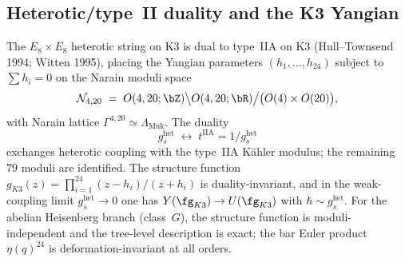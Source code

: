 \smallskip\noindent



\subsection{Heterotic/type~II duality and the K3 Yangian}
\label{subsec:k3-heterotic-typeII}

The $E_8\times E_8$ heterotic string on K3 is dual to type~IIA on K3
(Hull--Townsend 1994; Witten 1995), placing the Yangian parameters
$(h_1,\ldots,h_{24})$ subject to $\sum h_i=0$ on the Narain moduli space
\begin{equation}\label{eq:narain-moduli}
 \mathcal{N}_{4,20}
 \;=\;
 O(4,20;\bZ)\big\backslash O(4,20;\bR)\big/\bigl(O(4)\times O(20)\bigr),
\end{equation}
with Narain lattice $\Gamma^{4,20}\simeq\Lambda_{\mathrm{Muk}}$. The
duality
\begin{equation}\label{eq:het-iia-coupling}
 g_s^{\mathrm{het}} \;\longleftrightarrow\; t^{\mathrm{IIA}} = 1/g_s^{\mathrm{het}}
\end{equation}
exchanges heterotic coupling with the type~IIA K\"ahler modulus; the
remaining $79$ moduli are identified. The structure function
$g_{K3}(z) = \prod_{i=1}^{24}(z-h_i)/(z+h_i)$ is duality-invariant, and
in the weak-coupling limit $g_s^{\mathrm{het}}\to 0$ one has
$Y(\fg_{K3})\to U(\fg_{K3})$ with $\hbar\sim g_s^{\mathrm{het}}$. For the
abelian Heisenberg branch (class~$G$), the structure function is
moduli-independent and the tree-level description is exact; the bar
Euler product $\eta(q)^{24}$ is deformation-invariant at all orders.

